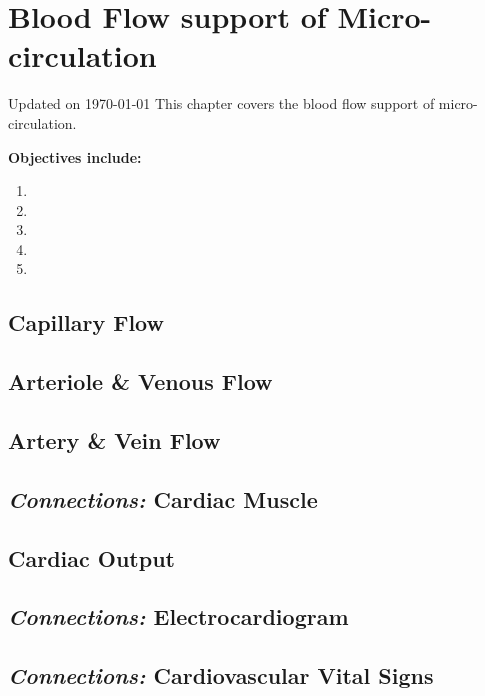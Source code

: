 \chapter{Blood Flow support of Micro-circulation}\label{chp:blood_flow}
Updated on \today
\minitoc
This chapter covers the blood flow support of micro-circulation. 

\vspace{5mm}

\textbf{Objectives include:}
\begin{enumerate}
    \item
    \item
    \item
    \item
    \item
\end{enumerate}

\section{Capillary Flow}

\section{Arteriole \& Venous Flow}

\section{Artery \& Vein Flow}

\section{\textit{Connections:} Cardiac Muscle}

\section{Cardiac Output}

\section{\textit{Connections:} Electrocardiogram}

\section{\textit{Connections:} Cardiovascular Vital Signs}

\printbibliography[heading=subbibintoc]
